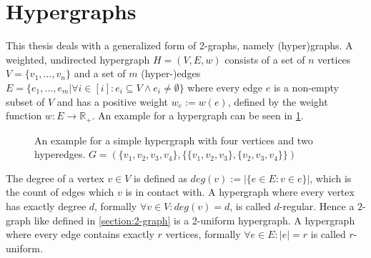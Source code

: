 \section{Hypergraphs} \label{section:hypergraphs}
This thesis deals with a generalized form of 2-graphs, namely (hyper)graphs.
A weighted, undirected hypergraph $H = (V, E, w)$ consists of a set of $n$ vertices $V = \{v_1, \ldots, v_n\}$ and a set of $m$ (hyper-)edges $E = \{ e_1, \ldots , e_m | \forall i \in [i]: e_i \subseteq V \land e_i \neq \emptyset \} $ where every edge $e$ is a non-empty subset of $V$ and has a positive weight $w_e:= w(e) $, defined by the weight function $w: E \to  \mathbb{R}_+ $. An example for a hypergraph can be seen in \cref{fig:exapmlehypergraph}.



	
\begin{figure} [htpb]
	\centering
	\caption[Example hypergraph]{An example for a simple hypergraph with four vertices and two hyperedges. $G=(\{v_1, v_2, v_3, v_4\},\{\{v_1, v_2, v_3\}, \{v_2,v_3, v_4\}\} )$}\label{fig:exapmlehypergraph}
\end{figure}


The degree of a vertex $v\in V$ is defined as $deg(v) := |\{e\in E: v\in e\}|$, which is the count of edges which $v$ is in contact with.
A hypergraph where every vertex has exactly degree $d$, formally $\forall v\in V : deg(v) =d $,  is called $d$-regular. Hence a 2-graph like defined in \cref{section:2-graph} is a 2-uniform hypergraph.
A hypergraph where every edge contains exactly $r$ vertices, formally $\forall e\in E : |e| =r $ is called $r$-uniform.

